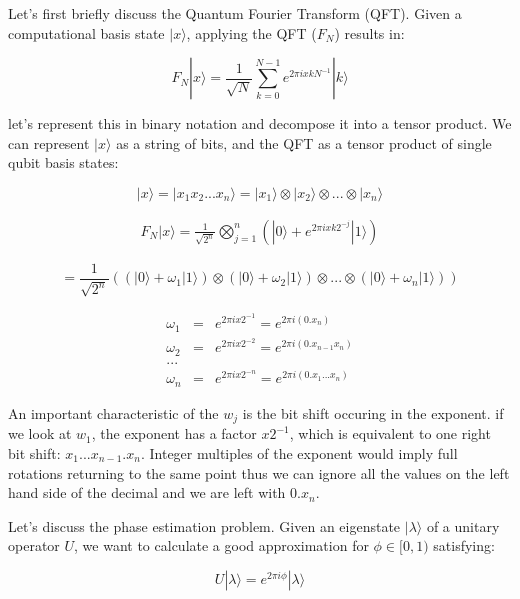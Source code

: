\documentclass[twocolumn,showpacs,preprintnumbers,amsmath,amssymb]{revtex4}
\begin{document}
		Let's first briefly discuss the Quantum Fourier Transform (QFT). Given a computational basis state $|x\rangle$, applying the QFT ($F_N$) results in:
		
		$$ F_N |x \rangle = \frac{1}{\sqrt{N}} \sum_{k=0}^{N-1} e^{2\pi i x k N^{-1}} |k\rangle $$
		
		let's represent this in binary notation and decompose it into a tensor product. We can represent $|x\rangle$ as a string of bits, and the QFT as a tensor product of single qubit basis states:
				
		$$|x\rangle = |x_1x_2 ... x_n\rangle =  |x_1\rangle \otimes |x_2\rangle \otimes ... \otimes |x_n\rangle$$
		
		\begin{eqnarray}
		F_N |x \rangle = \frac{1}{\sqrt{2^n}} \bigotimes_{j=1}^n (|0\rangle +  e^{2\pi i x k 2^{-j}} |1\rangle)
		\end{eqnarray}
		
		$$= \frac{1}{\sqrt{2^n}} ((|0\rangle + \omega_1|1\rangle)  \otimes(|0\rangle + \omega_2|1\rangle)\otimes ... \otimes(|0\rangle + \omega_n|1\rangle))$$
	    
	     
		\begin{eqnarray*}
		\omega_1 &=& e^{2\pi i x 2^{-1}} =  e^{2\pi i (0.x_n)}\\
		\omega_2 &=& e^{2\pi i x 2^{-2}} =  e^{2\pi i (0.x_{n-1}x_n)}\\
		...\\
		\omega_n &=& e^{2\pi i x 2^{-n}} =  e^{2\pi i (0.x_1...x_n)}
		\end{eqnarray*}
	    
		
		An important characteristic of the $w_j$ is the bit shift occuring in the exponent. if we look at $w_1$, the exponent has a factor $x 2^{-1}$, which is equivalent to one right bit shift: $x_1...x_{n-1}.x_n$. Integer multiples of the exponent would imply full rotations returning to the same point thus we can ignore all the values on the left hand side of the decimal and we are left with $0.x_n$. 
		
		
	    
		Let's discuss the phase estimation problem. Given an eigenstate $|\lambda \rangle$ of a unitary operator $U$, we want to calculate a good approximation  for $\phi \in [0,1)$ satisfying:
		
		\begin{equation}
		 U |\lambda \rangle = e^{2\pi i \phi} |\lambda \rangle
	    \end{equation}
	    
\end{document}
